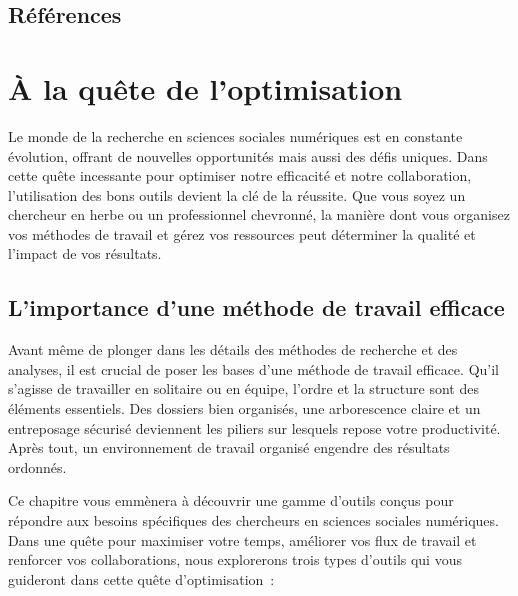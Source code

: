 \documentclass[
  letterpaper,
]{scrbook}
\begin{document}
\clearpage

\hypertarget{ruxe9fuxe9rences-1}{%
\section{Références}\label{ruxe9fuxe9rences-1}}


\hypertarget{sec-chap8}{%
\chapter{À la quête de l'optimisation}\label{sec-chap8}}

Le monde de la recherche en sciences sociales numériques est en
constante évolution, offrant de nouvelles opportunités mais aussi des
défis uniques. Dans cette quête incessante pour optimiser notre
efficacité et notre collaboration, l'utilisation des bons outils devient
la clé de la réussite. Que vous soyez un chercheur en herbe ou un
professionnel chevronné, la manière dont vous organisez vos méthodes de
travail et gérez vos ressources peut déterminer la qualité et l'impact
de vos résultats.

\hypertarget{limportance-dune-muxe9thode-de-travail-efficace}{%
\section{L'importance d'une méthode de travail
efficace}\label{limportance-dune-muxe9thode-de-travail-efficace}}

Avant même de plonger dans les détails des méthodes de recherche et des
analyses, il est crucial de poser les bases d'une méthode de travail
efficace. Qu'il s'agisse de travailler en solitaire ou en équipe,
l'ordre et la structure sont des éléments essentiels. Des dossiers bien
organisés, une arborescence claire et un entreposage sécurisé deviennent
les piliers sur lesquels repose votre productivité. Après tout, un
environnement de travail organisé engendre des résultats ordonnés.

Ce chapitre vous emmènera à découvrir une gamme d'outils conçus pour
répondre aux besoins spécifiques des chercheurs en sciences sociales
numériques. Dans une quête pour maximiser votre temps, améliorer vos
flux de travail et renforcer vos collaborations, nous explorerons trois
types d'outils qui vous guideront dans cette quête d'optimisation~:
\end{document}
